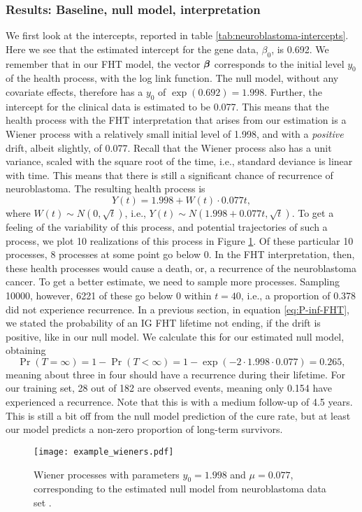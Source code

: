 \subsubsection{Results: Baseline, null model, interpretation}
We first look at the intercepts, reported in table \ref{tab:neuroblastoma-intercepts}.
Here we see that the estimated intercept for the gene data, $\beta_0$, is 0.692.
We remember that in our FHT model, the vector $\boldsymbol{\beta}$ corresponds to the initial level $y_0$ of the health process, with the log link function.
The null model, without any covariate effects, therefore has a $y_0$ of $\exp(0.692)=1.998$.
Further, the intercept for the clinical data is estimated to be 0.077.
This means that the health process with the FHT interpretation that arises from our estimation is a Wiener process with a relatively small initial level of 1.998, and with a \textit{positive} drift, albeit slightly, of 0.077.
Recall that the Wiener process also has a unit variance, scaled with the square root of the time, i.e., standard deviance is linear with time.
This means that there is still a significant chance of recurrence of neuroblastoma.
The resulting health process is
\begin{equation}
    Y(t)=1.998+W(t)\cdot0.077t,
\end{equation}
where $W(t)\sim N(0,\sqrt{t})$,
i.e.,
$Y(t)\sim N(1.998+0.077t,\sqrt{t})$.
To get a feeling of the variability of this process, and potential trajectories of such a process, we plot 10 realizations of this process in Figure \ref{fig:neuroblastoma-wiener}.
Of these particular 10 processes, 8 processes at some point go below 0.
In the FHT interpretation, then, these health processes would cause a death, or, a recurrence of the neuroblastoma cancer.
To get a better estimate, we need to sample more processes.
Sampling 10000, however, 6221 of these go below 0 within $t=40$, i.e., a proportion of 0.378 did not experience recurrence.
In a previous section, in equation \eqref{eq:P-inf-FHT}, we stated the probability of an IG FHT lifetime not ending, if the drift is positive, like in our null model.
We calculate this for our estimated null model, obtaining
\begin{equation*}
    \Pr{(T=\infty)}=1-\Pr{(T<\infty)}=1-\exp{(-2\cdot 1.998\cdot 0.077)}=0.265,
\end{equation*}
meaning about three in four should have a recurrence during their lifetime.
For our training set, 28 out of 182 are observed events, meaning only 0.154 have experienced a recurrence.
Note that this is with a medium follow-up of 4.5 years.
This is still a bit off from the null model prediction of the cure rate, but at least our model predicts a non-zero proportion of long-term survivors.
\begin{figure}\label{fig:neuroblastoma-wiener}
\caption{Wiener processes with parameters $y_0=1.998$ and $\mu=0.077$, corresponding to the estimated null model from neuroblastoma data set \citep{oberthuer-data}.}
\centering\texttt{[image: example\_wieners.pdf]}
\end{figure}




